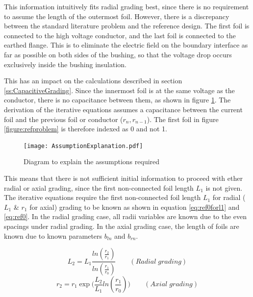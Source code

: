 This information intuitively fits radial grading best, since there is no requirement to assume the length of the outermost foil.
However, there is a discrepancy between the standard literature problem and the reference design.
The first foil is connected to the high voltage conductor, and the last foil is connected to the earthed flange.
This is to eliminate the electric field on the boundary interface as far as possible on both sides of the bushing, so that the voltage drop occurs exclusively inside the bushing insulation.

This has an impact on the calculations described in section \ref{ss:CapacitiveGrading}.
Since the innermost foil is at the same voltage as the conductor, there is no capacitance between them, as shown in figure \ref{figure:requiredassumptions}.
The derivation of the iterative equations assumes a capacitance between the current foil and the previous foil or conductor ($r_n,r_{n-1}$). 
The first foil in figure \ref{figure:refproblem} is therefore indexed as 0 and not 1.

\begin{figure}[!h]
   \centering
   \texttt{[image: AssumptionExplanation.pdf]}
   \caption{Diagram to explain the assumptions required}
   \label{figure:requiredassumptions}
\end{figure}

This means that there is not sufficient initial information to proceed with ether radial or axial grading, since the first non-connected foil length $L_1$ is not given.
The iterative equations require the first non-connected foil length $L_1$ for radial ( $L_1$ \& $r_1$ for axial) grading to be known as shown in equation \ref{eq:ref0forl1} and \ref{eq:ref0}. 
In the radial grading case, all radii variables are known due to the even spacings under radial grading. In the axial grading case, the length of foils are known due to known parameters $b_{ln}$ and $b_{rn}$.

\begin{equation}
   \label{eq:ref0forl1}
   L_{2} = L_{1}\displaystyle\frac{{ln(\displaystyle\frac{r_{2}}{r_{1}})} }{ln(\displaystyle\frac{r_{1}}{r_{0}})} \qquad (Radial \; grading)
\end{equation}
\begin{equation}
  \label{eq:ref0}
  \displaystyle r_2= \displaystyle  r_{1} \displaystyle \exp\big( \displaystyle  \frac{L_2}{L_{1}}ln(\displaystyle \frac{r_1}{r_0})\big) \qquad (Axial \; grading)
\end{equation}



